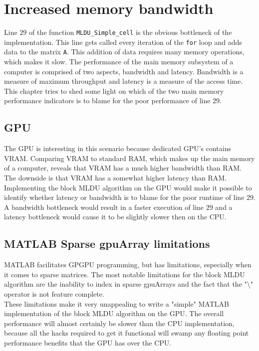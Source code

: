 \chapter{Increased memory bandwidth}

Line $29$ of the function \texttt{MLDU\_Simple\_cell} is the obvious bottleneck of the implementation. This line gets called every iteration of the \texttt{for} loop and adds data to the matrix \texttt{A}. This addition of data requires many memory operations, which makes it slow. The performance of the main memory subsystem of a computer is comprised of two aspects, bandwidth and latency. Bandwidth is a measure of maximum throughput and latency is a measure of the access time.\\

\noindent This chapter tries to shed some light on which of the two main memory performance indicators is to blame for the poor performance of line $29$.

\section{GPU}

The GPU is interesting in this scenario because dedicated GPU's contains VRAM. Comparing VRAM to standard RAM, which makes up the main memory of a computer, reveals that VRAM has a much higher bandwidth than RAM. The downside is that VRAM has a somewhat higher latency than RAM.\\

\noindent Implementing the block MLDU algorithm on the GPU would make it possible to identify whether latency or bandwidth is to blame for the poor runtime of line $29$. A bandwidth bottleneck would result in a faster execution of line $29$ and a latency bottleneck would cause it to be slightly slower then on the CPU.

\section{MATLAB Sparse gpuArray limitations}

MATLAB facilitates GPGPU programming, but has limitations, especially when it comes to sparse matrices. The most notable limitations for the block MLDU algorithm are the inability to index in sparse gpuArrays and the fact that the "\textbackslash" operator is not feature complete.\\

\noindent These limitations make it very unappealing to write a "simple" MATLAB implementation of the block MLDU algorithm on the GPU. The overall performance will almost certainly be slower than the CPU implementation, because all the hacks required to get it functional will swamp any floating point performance benefits that the GPU has over the CPU.\\

